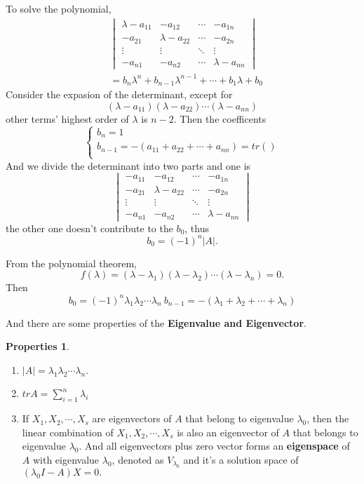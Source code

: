 \documentclass{article}
\theoremstyle{definition}
\newtheorem{pro}{Properties}[section]
\begin{document}
To solve the polynomial,
\begin{align*}
    &\begin{vmatrix}
        \lambda-a_{11} & -a_{12} & \cdots & -a_{1n} \\
        -a_{21} & \lambda-a_{22} & \cdots & -a_{2n} \\
        \vdots & \vdots & \ddots & \vdots \\
        -a_{n1} & -a_{n2} & \cdots & \lambda-a_{nn}
    \end{vmatrix}
    \\ & =
    b_{n}\lambda^{n}+b_{n-1}\lambda^{n-1}+\cdots+b_{1}\lambda+b_{0}
\end{align*}
Consider the expasion of the determinant, except for 
$$(\lambda-a_{11})(\lambda-a_{22})\cdots (\lambda-a_{nn})$$ 
other terms' highest order of $\lambda$ is $n-2$.
Then the coefficents
$$\begin{cases}
    b_{n} = 1 \\
    b_{n-1} = -(a_{11}+a_{22}+\cdots+a_{nn}) = tr()\\ 
\end{cases}
$$
And we divide the determinant into two parts and one is 
$$\begin{vmatrix}
    -a_{11} & -a_{12} & \cdots & -a_{1n} \\
    -a_{21} & \lambda-a_{22} & \cdots & -a_{2n} \\
    \vdots & \vdots & \ddots & \vdots \\
    -a_{n1} & -a_{n2} & \cdots & \lambda-a_{nn}
\end{vmatrix}$$
the other one doesn't contribute to the $b_{0}$, thus $$b_{0}=(-1)^{n}|A|.$$

From the polynomial theorem, 
$$f(\lambda)=(\lambda-\lambda_{1})(\lambda-\lambda_{2})\cdots (\lambda-\lambda_{n})=0.$$
Then 
$$b_{0}=(-1)^{n}\lambda_{1}\lambda_{2}\cdots\lambda_{n}\ b_{n-1}=-(\lambda_{1}+\lambda_{2}+\cdots+\lambda_{n})$$

And there are some properties of the \textbf{Eigenvalue and Eigenvector}.
\begin{pro}
\begin{enumerate}
    \item $|A|=\lambda_{1}\lambda_{2}\cdots\lambda_{n}$.
    \item $tr A=\sum_{i=1}^{n}\lambda_{i}$
    \item If $X_{1},X_{2},\cdots,X_{s}$ are eigenvectors of $A$ that belong to eigenvalue $\lambda_{0}$, then
    the linear combination of $X_{1},X_{2},\cdots,X_{s}$ is also an eigenvector of $A$ that belongs to eigenvalue $\lambda_{0}$.
    And all eigenvectors plus zero vector forms an \textbf{eigenspace} of $A$ with eigenvalue $\lambda_{0}$, denoted as $V_{\lambda_{0}}$
    and it's a solution space of $(\lambda_{0}I-A)X=0.$
\end{enumerate}
\end{pro}
\end{document}
